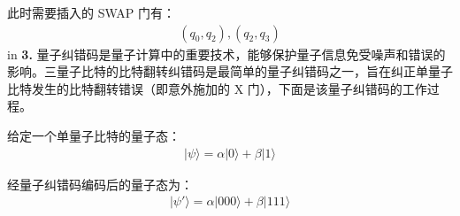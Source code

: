 \documentclass[11pt]{article}
\begin{document}
此时需要插入的 SWAP 门有：
\begin{align*}
    (q_0, q_2), (q_2, q_3)
\end{align*}
 in
\newpage
{\bf 3.} 量子纠错码是量子计算中的重要技术，能够保护量子信息免受噪声和错误的影响。三量子比特的比特翻转纠错码是最简单的量子纠错码之一，旨在纠正单量子比特发生的比特翻转错误（即意外施加的 X 门），下面是该量子纠错码的工作过程。

给定一个单量子比特的量子态：
\begin{align*}
    |\psi\rangle = \alpha|0\rangle + \beta|1\rangle
\end{align*}

经量子纠错码编码后的量子态为：
\begin{align*}
    |\psi'\rangle = \alpha|000\rangle + \beta|111\rangle
\end{align*}
\end{document}
